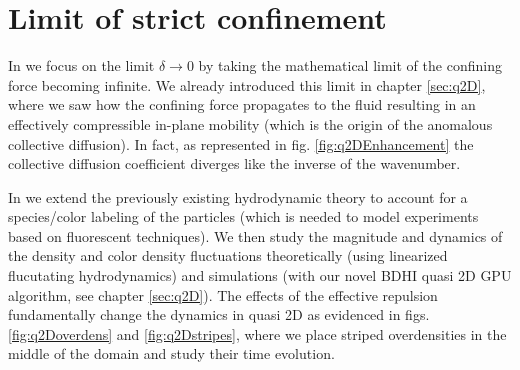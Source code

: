 \documentclass[ twoside,openright,titlepage,numbers=noenddot,%
headinclude,footinclude,cleardoublepage=empty,abstract=on,
BCOR=5mm,paper=a4,fontsize=11pt, dvipsnames
]{scrreprt}
\newcommand{\gpu}{\gls{GPU}\xspace}
\begin{document}
\section{Limit of strict confinement}\label{sec:strictconf}
In \cite{Pelaez2018} we focus on the limit $\delta\rightarrow 0$ by taking the mathematical limit of the confining force becoming infinite. We already introduced this limit in chapter \ref{sec:q2D}, where we saw how the confining force propagates to the fluid resulting in an effectively compressible in-plane mobility (which is the origin of the anomalous collective diffusion). In fact, as represented in fig. \ref{fig:q2DEnhancement} the collective diffusion coefficient diverges like the inverse of the wavenumber.

In \cite{Pelaez2018} we extend the previously existing hydrodynamic theory to account for a species/color labeling of the particles (which is needed to model experiments based on fluorescent techniques). We then study the magnitude and dynamics of the density and color density fluctuations theoretically (using linearized flucutating hydrodynamics) and simulations (with our novel \gls{BDHI} quasi 2D \gpu algorithm, see chapter \ref{sec:q2D}).
The effects of the effective repulsion fundamentally change the dynamics in quasi 2D as evidenced in figs. \ref{fig:q2Doverdens} and \ref{fig:q2Dstripes}, where we place striped overdensities in the middle of the domain and study their time evolution.
\end{document}
